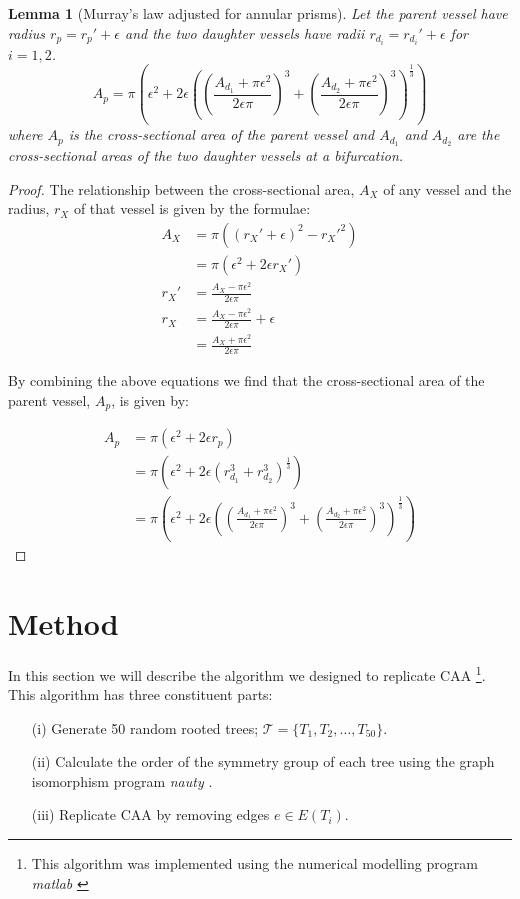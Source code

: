 \documentclass[10pt]{amsart} %
\newtheorem{lem}[thm]{Lemma}
\theoremstyle{definition}
\begin{document}
\begin{lem}[Murray's law adjusted for annular prisms]\label{lem:murr}
Let the parent vessel have radius $r_{p} = r_{p}' + \epsilon$ and the two 
daughter vessels have radii $r_{d_i} = r_{d_i}' + \epsilon$ for $i = 1,2$.
 \[A_p = \pi\left(\epsilon^{2} + 2\epsilon \left(\left( \frac{A_{d_{1}} + \pi\epsilon^{2}}{2\epsilon\pi} \right)^{3} + \left( \frac{A_{d_{2}} + \pi\epsilon^{2}}{2\epsilon\pi} \right)^{3}\right)^{\frac{1}{3}}\right)\]
where $A_p$ is the cross-sectional area of the parent vessel and $A_{d_{1}}$ and $A_{d_{2}}$ are the cross-sectional areas of the two daughter vessels at a bifurcation.
\end{lem}
\begin{proof}
The relationship between the cross-sectional area, $A_{X}$ of any vessel and the radius, $r_{X}$ 
of that vessel is given by the formulae:
\begin{align*}
 A_{X} &= \pi((r_{X}' + \epsilon)^{2} - r_{X}'^{2})\\
 &= \pi(\epsilon^{2} + 2\epsilon r_{X}')\\
 r_{X}' &= \frac{A_{X} - \pi\epsilon^{2}}{2\epsilon\pi}\\
 r_{X} &=  \frac{A_{X} - \pi\epsilon^{2}}{2\epsilon\pi} + \epsilon \\
 &= \frac{A_{X} + \pi\epsilon^{2}}{2\epsilon\pi}
\end{align*}

By combining the above equations we find that the cross-sectional area of the parent
 vessel, $A_{p}$, is given by:

\begin{align*}
A_{p} &= \pi(\epsilon^{2} + 2\epsilon r_{p}) \\
&= \pi\left(\epsilon^{2} + 2\epsilon (r_{d_{1}}^{3} + r_{d_{2}}^{3})^{\frac{1}{3}}\right)\\
&= \pi\left(\epsilon^{2} + 2\epsilon \left(\left( \frac{A_{d_{1}} + \pi\epsilon^{2}}{2\epsilon\pi} \right)^{3} + \left( \frac{A_{d_{2}} + \pi\epsilon^{2}}{2\epsilon\pi} \right)^{3}\right)^{\frac{1}{3}}\right)
\end{align*}
\end{proof}

\section{Method}\label{sec:meth}

In this section we will describe the algorithm we designed to replicate CAA \footnote{This algorithm was implemented using the numerical modelling program \emph{matlab} \cite{matlab}}.  This algorithm has three constituent parts:
\begin{itemize}
\item[(i)] Generate 50 random rooted trees; $\mathcal{T} = \{ T_1,T_2,\dots,T_{50}\}$.
\item[(ii)]Calculate the order of the symmetry group of each tree using the graph isomorphism program \emph{nauty} \cite{nauty}.
\item[(iii)] Replicate CAA by removing edges $e \in E(T_i)$. 
\end{itemize} 
\end{document}
